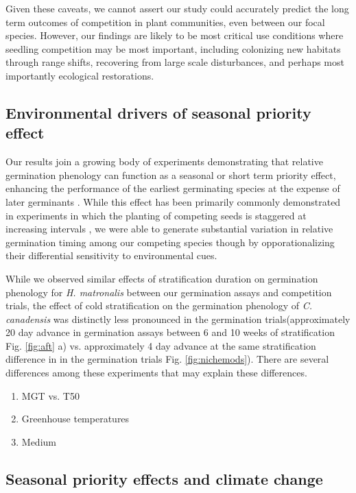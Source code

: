 \documentclass{article}\usepackage[]{graphicx}\usepackage[]{color}
\begin{document}
{Given these caveats, we cannot assert our study could accurately predict the long term outcomes of competition in plant communities, even between our focal species. However, our findings are likely to be most critical use conditions where seedling competition may be most important, including colonizing new habitats through range shifts, recovering from large scale disturbances, and perhaps most importantly ecological restorations.

\subsection*{Environmental drivers of seasonal priority effect}
Our results join a growing body of experiments demonstrating that relative germination phenology can function as a seasonal or short term priority effect, enhancing the performance of the earliest germinating species at the expense of later germinants \citep{}. While this effect has been primarily commonly demonstrated in experiments in which the planting of competing seeds is staggered at increasing intervals \citep{}, we were able to generate substantial variation in relative germination timing among our competing species though by opporationalizing their differential sensitivity to environmental cues.

While we observed similar effects of stratification duration on germination phenology for \textit{H. matronalis} between our germination assays and competition trials, the effect of cold stratification on the germination phenology of \textit{C. canadensis} was distinctly less pronounced in the germination trials(approximately 20 day advance in germination assays between 6 and 10 weeks of stratification Fig. \ref{fig:aft} a) vs.  approximately 4 day advance at the same stratification difference  in in the germination trials Fig. \ref{fig:nichemods}). There are several differences among these experiments that may explain these differences.

\begin{enumerate}
\item MGT vs. T50
\item Greenhouse temperatures
\item Medium
\end{enumerate}
\subsection{Seasonal priority effects and climate change}






}
\end{document}
